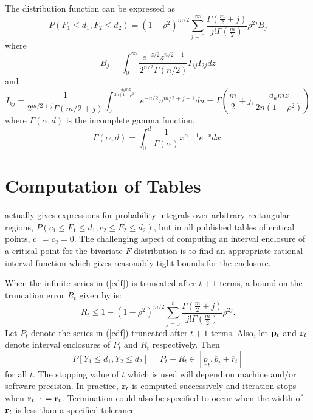 The distribution function can be expressed as
\begin{equation}
\label{cdf}
P(F_1 \leq d_1, F_2 \leq d_2) =
  (1-\rho^2)^{m/2} 
  \sum_{j=0}^\infty 
  \frac{\Gamma (\frac{m}{2}+j)}{j! \Gamma (\frac{m}{2})} 
  \rho^{2j} B_j
\end{equation}
where
$$ 
B_j = \int_0^\infty \frac{e^{-z/2} z^{n/2-1}}{2^{n/2} \Gamma (n/2)} 
        I_{1j} I_{2j} dz
$$
and 
\begin{equation}
I_{kj} =   \frac{1}{2^{m/2+j} \Gamma (m/2 +j)} 
     \int_0^{\frac{d_k m z}{2n(1-\rho^2)}} e^{-u/2} u^{m/2+j-1} du 
  = \Gamma\left(\frac{m}{2}+j, \frac{d_k m z}{2n(1-\rho^2)}\right)
\end{equation}
where $\Gamma(\alpha, d) $ is the incomplete gamma function, 
$$
\Gamma(\alpha, d) = 
          \int_0^d   \frac{1}{\Gamma(\alpha)} x^{\alpha -1} e^{-x} dx.
$$
\section{Computation of Tables}

\cite{Krishnaiah80} actually gives expressions for probability integrals over
arbitrary rectangular regions, $P(c_1 \leq F_1 \leq d_1,c_2 \leq F_2 \leq d_2)$,
but in all published tables of critical points, $c_1=c_2 = 0$.
The challenging aspect of computing an interval
enclosure of a critical point for the
bivariate $F$ distribution is to find an appropriate rational interval 
function which gives reasonably tight bounds for the enclosure.

When the infinite series in (\ref{cdf}) is truncated after $t+1$ terms, 
a bound on the truncation error $R_t$ given by \cite{Krishnaiah75} is:
\begin{equation}
\label{bivftruncerr}
R_t \leq 1- (1-\rho^2)^{m/2}
  \sum_{j=0}^t \frac{\Gamma (\frac{m}{2}+j)}{ j! \Gamma (\frac{m}{2}) }
  \rho^{2j}. 
\end{equation}
Let $P_t$ denote the series in (\ref{cdf}) truncated after $t+1$ terms.  Also,
let ${\bf p}_t$ and ${\bf r}_t$ denote interval enclosures of $P_t$ and $R_t$
respectively.  Then 
$$P[Y_1 \leq d_1, Y_2 \leq d_2] = P_t + R_t \in
 [ \underline{p}_t , \overline{p}_t + \overline{r}_t]$$ for all $t$.
The stopping value of $t$ which is used will depend on machine and/or software
precision.  In practice, ${\bf r}_t$ is computed successively and iteration 
stops when 
${\bf r}_{t-1} = {\bf r}_t$.  Termination could also be specified to occur
when the width of ${\bf r}_{t}$ is less than
a specified tolerance.

